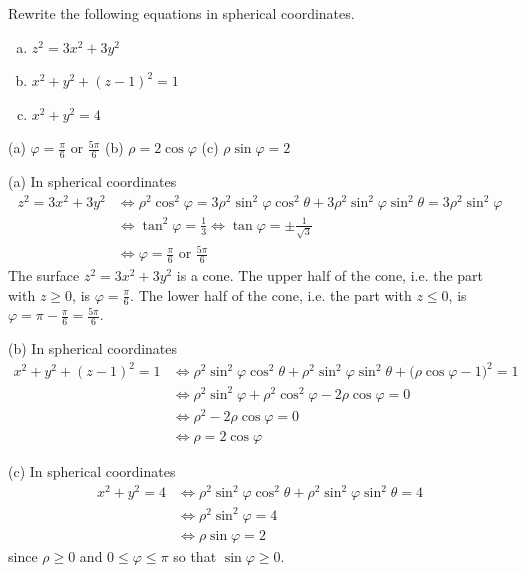 \begin{question}
Rewrite the following equations in spherical coordinates.
\begin{enumerate}[(a)]
\item $z^2=3x^2+3y^2$
\item $x^2+y^2+(z-1)^2=1$
\item $x^2+y^2=4$
\end{enumerate}

\end{question}

%

\begin{answer}
(a) $\varphi=\frac{\pi}{6}\text{ or }\frac{5\pi}{6}$\qquad
(b) $\rho=2\cos\varphi$\qquad
(c) $\rho\sin\varphi=2$
\end{answer}

\begin{solution}
(a) In spherical coordinates
\begin{align*}
z^2=3x^2+3y^2
&\iff
\rho^2\cos^2\varphi = 3\rho^2\sin^2\varphi\cos^2\theta
                     +3\rho^2\sin^2\varphi\sin^2\theta 
                    =3\rho^2\sin^2\varphi \\
&\iff
\tan^2\varphi=\frac{1}{3}
\iff
\tan\varphi=\pm\frac{1}{\sqrt{3}} \\
&\iff \varphi=\frac{\pi}{6}\text{ or }\frac{5\pi}{6}
\end{align*}
The surface $z^2=3x^2+3y^2$ is a cone. The upper half of the cone,
i.e. the part with $z\ge 0$, is $\varphi=\frac{\pi}{6}$.
The lower half of the cone,
i.e. the part with $z\le 0$, is $\varphi=\pi-\frac{\pi}{6}=\frac{5\pi}{6}$.

(b) In spherical coordinates
\begin{align*}
x^2+y^2+(z-1)^2=1
&\iff
\rho^2\sin^2\varphi\cos^2\theta
    +\rho^2\sin^2\varphi\sin^2\theta 
    +\big(\rho\cos\varphi-1\big)^2
                    =1 \\
&\iff
\rho^2\sin^2\varphi 
    +\rho^2\cos^2\varphi-2\rho\cos\varphi
                    =0 \\
&\iff
\rho^2-2\rho\cos\varphi =0 \\
&\iff \rho=2\cos\varphi
\end{align*}

(c) In spherical coordinates
\begin{align*}
x^2+y^2=4
&\iff
\rho^2\sin^2\varphi\cos^2\theta
    +\rho^2\sin^2\varphi\sin^2\theta
                    =4 \\
&\iff
\rho^2\sin^2\varphi  =4 \\
&\iff
\rho\sin\varphi=2
\end{align*}
since $\rho\ge 0$ and $0\le\varphi\le\pi$ so that $\sin\varphi\ge 0$.

\end{solution}


